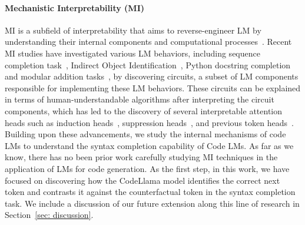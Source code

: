 {\paragraph{Mechanistic Interpretability (MI)} MI is a subfield of interpretability that aims to reverse-engineer LM by understanding their internal components and computational processes~\cite{elhage2021mathematical, olah2020zoom, rai2024practical, bereska2024mechanistic}. Recent MI studies have investigated various LM behaviors, including sequence completion task~\cite{elhage2021mathematical}, Indirect Object Identification~\cite{wang2022interpretabilitywildcircuitindirect}, Python docstring completion~\cite{heimersheim2023circuit, conmy2023towards} and modular addition tasks~\cite{nanda2023progress}, by discovering circuits, a subset of LM components responsible for implementing these LM behaviors. These circuits can be explained in terms of human-understandable algorithms after interpreting the circuit components, which has led to the discovery of several interpretable attention heads such as induction heads~\cite{elhage2021mathematical}, suppression heads~\cite{mcdougall2023copy}, and previous token heads~\cite{elhage2021mathematical}. Building upon these advancements, we study the internal mechanisms of code LMs to understand the syntax completion capability of Code LMs. As far as we know, there has no been prior work carefully studying MI techniques in the application of LMs for code generation. As the first step, in this work, we have focused on discovering how the CodeLlama model identifies the correct next token and contrasts it against the counterfactual token in the syntax completion task. We include a discussion of our future extension along this line of research in Section~\ref{sec: discussion}.}